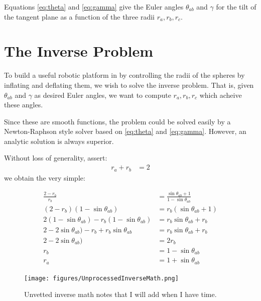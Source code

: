 \documentclass{article}
\begin{document}
Equations \ref{eq:theta} and \ref{eq:gamma} give the Euler angles
$\theta_{ab}$ and $\gamma$
for the tilt of the
tangent plane as a function of the three radii $r_a,r_b,r_c$.


\section{The Inverse Problem}

To build a useful robotic platform in by controlling the radii of the
spheres by inflating and deflating them, we wish to solve the inverse
problem. That is, given $\theta_{ab}$ and $\gamma$ as desired Euler
angles, we want to compute $r_a,r_b,r_c$ which acheive these angles.

Since these are smooth functions, the problem could be solved
easily by a Newton-Raphson style solver based on \ref{eq:theta} and \ref{eq:gamma}. However, an analytic solution is always superior.


Without loss of generality, assert:
\begin{align}
r_a + r_b &= 2
\end{align}
we obtain the very simple:

\begin{align}
  \frac{2-r_b}{r_b} &=  \frac{\sin{\theta_{ab}} + 1}{1 - \sin{\theta_{ab}}} \\
  (2-r_b)(1 - \sin{\theta_{ab}}) &= r_b(\sin{\theta_{ab}} + 1) \\
  2(1 - \sin{\theta_{ab}}) -r_b(1 - \sin{\theta_{ab}}) &= r_b\sin{\theta_{ab}} + r_b \\
  2 - 2\sin{\theta_{ab}}) -r_b + r_b\sin{\theta_{ab}} &= r_b\sin{\theta_{ab}} + r_b \\
  2 - 2\sin{\theta_{ab}})  &=  2 r_b \\
  r_b &= 1 - \sin{\theta_{ab}} \\
  r_a &= 1 + \sin{\theta_{ab}}
\end{align}

\begin{figure}
     \centering
     \texttt{[image: figures/UnprocessedInverseMath.png]}
     \caption{Unvetted inverse math notes that I will add when I have time.}
  \label{fig:Unprocessed}
\end{figure}

\newcommand{\abs}[1]{ \left\lvert#1\right\rvert}
\end{document}
